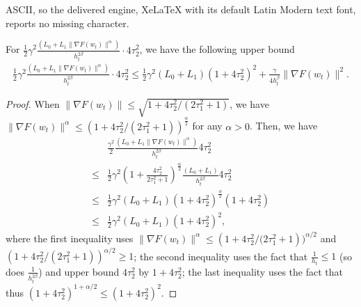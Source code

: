 \documentclass[10pt,a4paper]{amsart}
\begin{document}
ASCII, so the delivered engine, XeLaTeX with its default Latin Modern text font, reports no missing character.
\begin{lemma}\label{upper bound for term 1}
For $\frac{1}{2}\gamma^2\frac{(L_0+L_1\big \|\nabla F(w_t) \big \|^{\alpha})}{h_t^{2\beta}}\cdot{4\tau_2^2}$, we have the following upper bound
\begin{align}
    \frac{1}{2}\gamma^2\frac{(L_0+L_1\big \|\nabla F(w_t) \big \|^{\alpha})}{h_t^{2\beta}}\cdot{4\tau_2^2}\leq \frac{1}{2}\gamma^2(L_0+L_1)(1+4\tau_2^2)^2+ \frac{\gamma}{4h_t^{\beta}}\big \|\nabla F(w_t) \big \|^2.
    \label{stochastic noise bound}
\end{align}
\end{lemma}

\begin{proof}
        When $\big \|\nabla F(w_t) \big \|\leq \sqrt{1+{4\tau_2^2}/{(2\tau_1^2+1)}}$, we have $\big \|\nabla F(w_t) \big \|^{\alpha}\leq (1+{4\tau_2^2}/{(2\tau_1^2+1)})^{\frac{\alpha}{2}}$ for any $\alpha >0$. Then, we have
        \begin{align}
        &\frac{\gamma^2}{2}\frac{(L_0+L_1\big \|\nabla F(w_t) \big \|^{\alpha})}{h_t^{2\beta}}4\tau_2^2 \nonumber\\
        \leq& \frac{1}{2}\gamma^2(1+\frac{4\tau_2^2}{2\tau_1^2+1})^{\frac{\alpha}{2}}\frac{(L_0+L_1)}{h_t^{2\beta}}{4\tau_2^2}\nonumber \\
        \leq& \frac{1}{2}\gamma^2(L_0+L_1)(1+4\tau_2^2)^{\frac{\alpha}{2}}(1+4\tau_2^2) \nonumber\\
        \leq& \frac{1}{2}\gamma^2(L_0+L_1)(1+{4\tau_2^2})^{2},
        \label{stochastic noise bound 1}
    \end{align}
    where the first inequality uses $\|\nabla F(w_t) \|^{\alpha}\leq (1+{4\tau_2^2}/{(2\tau_1^2+1}))^{\alpha/2}$ and $(1+{4\tau_2^2}/{(2\tau_1^2+1)})^{\alpha/2}\geq1$; the second inequality uses the fact that $\frac{1}{h_t}\leq 1$ (so does $\frac{1}{h_t^{2\beta}}$) and upper bound ${4\tau_2^2}$ by 
    $1+4{\tau_2^2}$; the last inequality uses the fact that thus $(1+4{\tau_2^2})^{1+\alpha/2}\leq(1+4{\tau_2^2})^2 $.


\end{proof}
\end{document}
